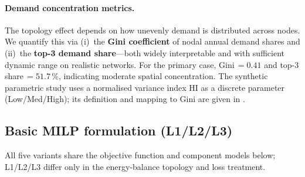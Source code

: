 \documentclass[a4paper,fleqn]{cas-dc}
\begin{document}
\paragraph{Demand concentration metrics.}
The topology effect depends on how unevenly demand is distributed
across nodes. We quantify this via (i)~the \textbf{Gini
coefficient} of nodal annual demand shares and (ii)~the
\textbf{top-3 demand share}---both widely interpretable and with
sufficient dynamic range on realistic networks. For the primary
case, Gini\,$= 0.41$ and top-3 share\,$= 51.7\,\%$, indicating
moderate spatial concentration. The synthetic parametric study uses a
normalised variance index HI as a discrete parameter
(Low/Med/High); its definition and mapping to Gini are given in
.

\subsection{Basic MILP formulation (L1/L2/L3)}
\label{sec:milp}

All five variants share the objective function and component models
below; L1/L2/L3 differ only in the energy-balance topology and
loss treatment.
\end{document}
